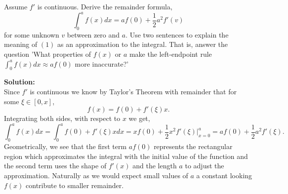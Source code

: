 \documentclass[12pt]{article}
\makeatletter
\theoremstyle{homework}
\newenvironment{exercise}[1]
{\def\@currentlabel{#1}\exercisecore}
{\endexercisecore}
\newcommand{\localhead}[1]{\par\smallskip\noindent\textbf{#1}\nobreak\\}%
\newcommand\solution{\localhead{Solution:}}
\makeatother
\begin{document}
\begin{exercise}{Problem P2} Assume $f'$ is continuous. Derive the remainder formula, 
  \begin{equation}
    \int_0^a f(x)dx = af(0) + \frac{1}{2}a^2f'(v)
  \end{equation}
  for some unknown $v$ between zero and $a$. Use two sentences to explain the meaning of $(1)$ as an approximation to the integral. That is, answer the question 'What properties of $f(x)$ or $a$ make the left-endpoint rule $\int_0^a f(x)dx \approx af(0)$ more inaccurate?' 
  \solution Since $f'$ is continuous we know by Taylor's Theorem with remainder that for some $\xi \in [0, x]$, 
  \begin{equation*}
    f(x) = f(0) + f'(\xi)x.
  \end{equation*}
  Integrating both sides, with respect to $x$ we get, 
  \begin{equation*}
    \int_0^a f(x) dx =  \int_0^a f(0) + f'(\xi)x dx = xf(0) + \frac{1}{2}x^2f'(\xi)|_{x = 0}^a =  af(0) + \frac{1}{2}a^2f'(\xi).
  \end{equation*}
  Geometrically, we see that the first term $af(0)$ represents the rectangular region which approximates the integral with the initial value of the function and the second term uses the shape of $f'(x)$ and the length $a$ to adjust the approximation. Naturally as we would expect small values of $a$ a constant looking $f(x)$ contribute to smaller remainder.
\end{exercise}
\vspace{1in}
\end{document}
